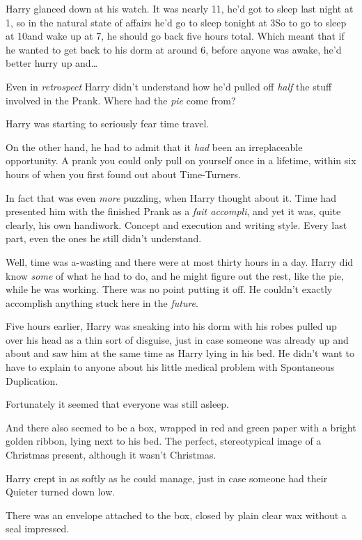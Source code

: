 Harry glanced down at his watch. It was nearly 11\am, he'd got to sleep last night at 1\am, so in the natural state of affairs he'd go to sleep tonight at 3\am So to go to sleep at 10\pm and wake up at 7\am, he should go back five hours total. Which meant that if he wanted to get back to his dorm at around 6\am, before anyone was awake, he'd better hurry up and{\ldots}

Even in \emph{retrospect} Harry didn't understand how he'd pulled off \emph{half} the stuff involved in the Prank. Where had the \emph{pie} come from?

Harry was starting to seriously fear time travel.

On the other hand, he had to admit that it \emph{had} been an irreplaceable opportunity. A prank you could only pull on yourself once in a lifetime, within six hours of when you first found out about Time-Turners.

In fact that was even \emph{more} puzzling, when Harry thought about it. Time had presented him with the finished Prank as a \emph{fait accompli}, and yet it was, quite clearly, his own handiwork. Concept and execution and writing style. Every last part, even the ones he still didn't understand.

Well, time was a-wasting and there were at most thirty hours in a day. Harry did know \emph{some} of what he had to do, and he might figure out the rest, like the pie, while he was working. There was no point putting it off. He couldn't exactly accomplish anything stuck here in the \emph{future}.

\later

Five hours earlier, Harry was sneaking into his dorm with his robes pulled up over his head as a thin sort of disguise, just in case someone was already up and about and saw him at the same time as Harry lying in his bed. He didn't want to have to explain to anyone about his little medical problem with Spontaneous Duplication.

Fortunately it seemed that everyone was still asleep.

And there also seemed to be a box, wrapped in red and green paper with a bright golden ribbon, lying next to his bed. The perfect, stereotypical image of a Christmas present, although it wasn't Christmas.

Harry crept in as softly as he could manage, just in case someone had their Quieter turned down low.

There was an envelope attached to the box, closed by plain clear wax without a seal impressed.

